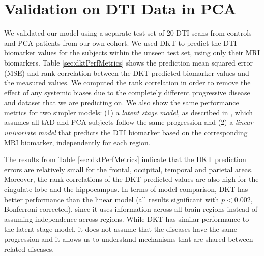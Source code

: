 \documentclass{llncs}
\begin{document}
\section{Validation on DTI Data in PCA}
\label{sec:dktResVal}

We validated our model using a separate test set of 20 DTI scans from controls and PCA patients from our own cohort. We used DKT to predict the DTI biomarker values for the subjects within the unseen test set, using only their MRI biomarkers. Table \ref{sec:dktPerfMetrics} shows the prediction mean squared error (MSE) and rank correlation between the DKT-predicted biomarker values and the measured values. We computed the rank correlation in order to remove the effect of any systemic biases due to the completely different progressive disease and dataset that we are predicting on. We also show the same performance metrics for two simpler models: (1) a \emph{latent stage model}, as described in \cite{jedynak2012computational}, which assumes all tAD and PCA subjects follow the same progression and (2) a \emph{linear univariate model} that predicts the DTI biomarker based on the corresponding MRI biomarker, independently for each region.

The results from Table \ref{sec:dktPerfMetrics} indicate that the DKT prediction errors are relatively small for the frontal, occipital, temporal and parietal areas. Moreover, the rank correlations of the DKT predicted values are also high for the cingulate lobe and the hippocampus. In terms of model comparison, DKT has better performance than the linear model (all results significant with $p < 0.002$, Bonferroni corrected), since it uses information across all brain regions instead of assuming independence across regions. While DKT has similar performance to the latent stage model, it does not assume that the diseases have the same progression and it allows us to understand mechanisms that are shared between related diseases. 

\newcommand{\cw}{c}
\end{document}
